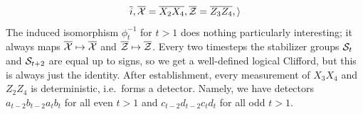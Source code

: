 \begin{example}
\begin{equation}
        \overline{i},
        \overline{\mathcal{X}} = \overline{X_2 X_4}, \overline{\mathcal{Z}} = \overline{Z_3 Z_4},
        \rangle
    \end{equation}
    The induced isomorphism $\phi_t^{-1}$ for $t > 1$ does nothing particularly interesting; it always maps $\overline{\mathcal{X}} \mapsto \overline{\mathcal{X}}$ and $\overline{\mathcal{Z}} \mapsto \overline{\mathcal{Z}}$.
    Every two timesteps the stabilizer groups $\mathcal{S}_t$ and $\mathcal{S}_{t+2}$ are equal up to signs, so we get a well-defined logical Clifford, but this is always just the identity.
    After establishment, every measurement of $X_3 X_4$ and $Z_2 Z_4$ is deterministic, i.e.\ forms a detector.
    Namely, we have detectors $a_{t-2} b_{t-2} a_{t} b_{t}$ for all even $t > 1$ and $c_{t-2} d_{t-2} c_{t} d_{t}$ for all odd $t > 1$.
\end{example}